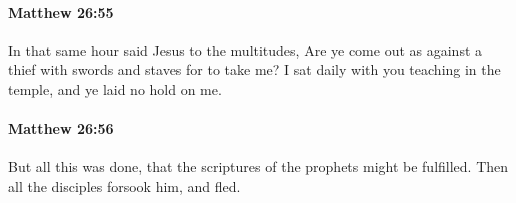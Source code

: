 		\paragraph{Matthew 26:55} %
			\label{MATTHEW-26-55}

			In that same hour said Jesus to the multitudes, Are ye come out as against a thief with swords and staves for to take me? I sat daily with you teaching in the temple, and ye laid no hold on me.

			\begin{framed}
			\scriptsize
				\begin{compactdesc}
					\item[SBLG] 
				\end{compactdesc}
			\end{framed}

		\paragraph{Matthew 26:56} %
			\label{MATTHEW-26-56}

			But all this was done, that the scriptures of the prophets might be fulfilled. Then all the disciples forsook him, and fled.

